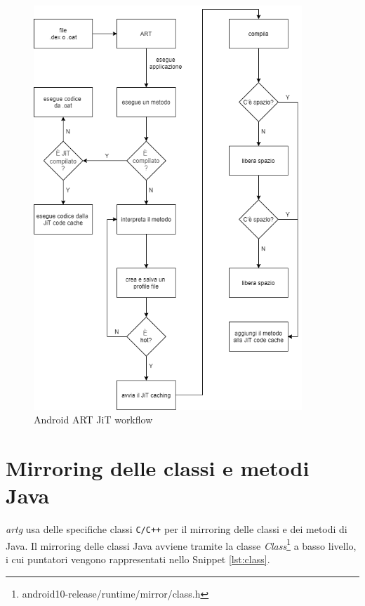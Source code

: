 \newpage


\begin{figure} [H]
\center
\includegraphics[width=0.9\textwidth]{figures/jit-workflow}
\caption[Android Runtime Just in Time Workflow]{Android ART JiT workflow
\label{fig:jit_workflow}}
\end{figure}


\section{Mirroring delle classi e metodi Java}




\emph{\gls{artg}} usa delle specifiche classi \texttt{C/C++} per il mirroring delle classi e dei metodi di Java. 
Il mirroring delle classi Java avviene tramite la classe \emph{Class}\footnote{android10-release/runtime/mirror/class.h} a basso livello, i cui puntatori vengono rappresentati nello Snippet \ref{lst:class}.


